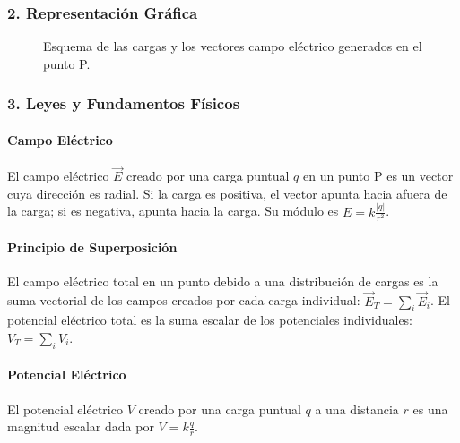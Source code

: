 \subsubsection*{2. Representación Gráfica}
\begin{figure}[H]
    \centering
    \caption{Esquema de las cargas y los vectores campo eléctrico generados en el punto P.}
\end{figure}
\subsubsection*{3. Leyes y Fundamentos Físicos}
\paragraph*{Campo Eléctrico}
El campo eléctrico $\vec{E}$ creado por una carga puntual $q$ en un punto P es un vector cuya dirección es radial. Si la carga es positiva, el vector apunta hacia afuera de la carga; si es negativa, apunta hacia la carga. Su módulo es $E = k \frac{|q|}{r^2}$.
\paragraph*{Principio de Superposición}
El campo eléctrico total en un punto debido a una distribución de cargas es la suma vectorial de los campos creados por cada carga individual: $\vec{E}_T = \sum_i \vec{E}_i$. El potencial eléctrico total es la suma escalar de los potenciales individuales: $V_T = \sum_i V_i$.
\paragraph*{Potencial Eléctrico}
El potencial eléctrico $V$ creado por una carga puntual $q$ a una distancia $r$ es una magnitud escalar dada por $V = k \frac{q}{r}$.


